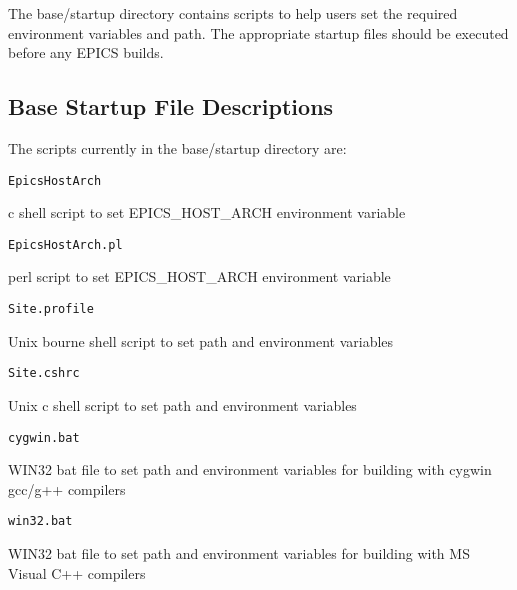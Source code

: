 The base/startup directory contains scripts to help users set the required environment variables and path. The appropriate 
startup files should be executed before any EPICS builds.

\subsection{Base Startup File Descriptions}

The scripts currently in the base/startup directory are:

\begin{verbatim}EpicsHostArch
\end{verbatim}\begin{description}\item c shell script to set EPICS\_HOST\_ARCH environment variable

\end{description}\begin{verbatim}EpicsHostArch.pl
\end{verbatim}\begin{description}\item perl script to set EPICS\_HOST\_ARCH environment variable

\end{description}\begin{verbatim}Site.profile
\end{verbatim}\begin{description}\item Unix bourne shell script to set path and environment variables

\end{description}\begin{verbatim}Site.cshrc
\end{verbatim}\begin{description}\item Unix c shell script to set path and environment variables

\end{description}\begin{verbatim}cygwin.bat
\end{verbatim}\begin{description}\item WIN32 bat file to set path and environment variables for building with cygwin gcc/g++ compilers

\end{description}\begin{verbatim}win32.bat
\end{verbatim}\begin{description}\item WIN32 bat file to set path and environment variables for building with MS Visual C++ compilers

\end{description}








